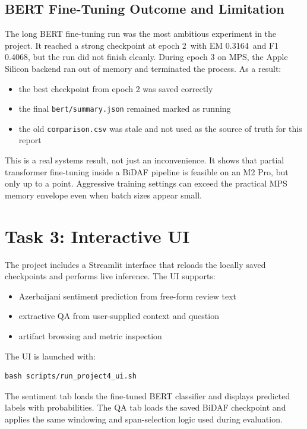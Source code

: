 \documentclass[11pt]{article}
\newcommand{\bertBestEpoch}{2}
\newcommand{\bertEM}{0.3164}
\newcommand{\bertFOne}{0.4068}
\begin{document}
\subsection{BERT Fine-Tuning Outcome and Limitation}
The long BERT fine-tuning run was the most ambitious experiment in the project. It reached a strong checkpoint at epoch \bertBestEpoch\ with EM \bertEM\ and F1 \bertFOne, but the run did not finish cleanly. During epoch 3 on MPS, the Apple Silicon backend ran out of memory and terminated the process. As a result:
\begin{itemize}
    \item the best checkpoint from epoch 2 was saved correctly
    \item the final \texttt{bert/summary.json} remained marked as running
    \item the old \texttt{comparison.csv} was stale and not used as the source of truth for this report
\end{itemize}

This is a real systems result, not just an inconvenience. It shows that partial transformer fine-tuning inside a BiDAF pipeline is feasible on an M2 Pro, but only up to a point. Aggressive training settings can exceed the practical MPS memory envelope even when batch sizes appear small.

\section{Task 3: Interactive UI}
The project includes a Streamlit interface that reloads the locally saved checkpoints and performs live inference. The UI supports:
\begin{itemize}
    \item Azerbaijani sentiment prediction from free-form review text
    \item extractive QA from user-supplied context and question
    \item artifact browsing and metric inspection
\end{itemize}

The UI is launched with:
\begin{verbatim}
bash scripts/run_project4_ui.sh
\end{verbatim}

The sentiment tab loads the fine-tuned BERT classifier and displays predicted labels with probabilities. The QA tab loads the saved BiDAF checkpoint and applies the same windowing and span-selection logic used during evaluation.
\end{document}
